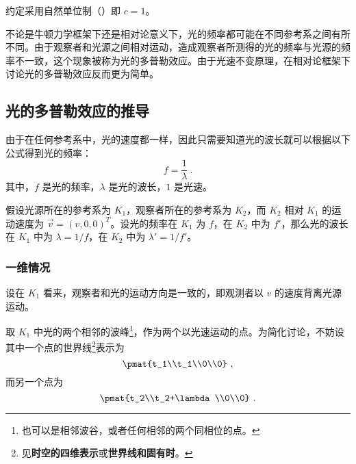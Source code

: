 

约定采用自然单位制（）即 $c=1$。

不论是牛顿力学框架下还是相对论意义下，光的频率都可能在不同参考系之间有所不同。由于观察者和光源之间相对运动，造成观察者所测得的光的频率与光源的频率不一致，这个现象被称为光的多普勒效应。由于光速不变原理，在相对论框架下讨论光的多普勒效应反而更为简单。


\subsection{光的多普勒效应的推导}
由于在任何参考系中，光的速度都一样，因此只需要知道光的波长就可以根据以下公式得到光的频率：
\begin{equation}
f=\frac{1}{\lambda}~.
\end{equation}
其中，$f$ 是光的频率，$\lambda$ 是光的波长，$1$ 是光速。

假设光源所在的参考系为 $K_1$，观察者所在的参考系为 $K_2$，而 $K_2$ 相对 $K_1$ 的运动速度为 $\vec{v}=(v, 0, 0)^T$。设光的频率在 $K_1$ 为 $f$，在 $K_2$ 中为 $f'$，那么光的波长在 $K_1$ 中为 $\lambda=1/f$，在 $K_2$ 中为 $\lambda'=1/f'$。

\subsubsection{一维情况}
设在 $K_1$ 看来，观察者和光的运动方向是一致的，即观测者以 $v$ 的速度背离光源运动。

取 $K_1$ 中光的两个相邻的波峰\footnote{也可以是相邻波谷，或者任何相邻的两个同相位的点。}，作为两个以光速运动的点。为简化讨论，不妨设其中一个点的世界线\footnote{见\textbf{时空的四维表示}或\textbf{世界线和固有时}。}表示为
\begin{equation}
\pmat{t_1\\t_1\\0\\0}~,
\end{equation}
而另一个点为
\begin{equation}
\pmat{t_2\\t_2+\lambda\\0\\0}~.
\end{equation}

